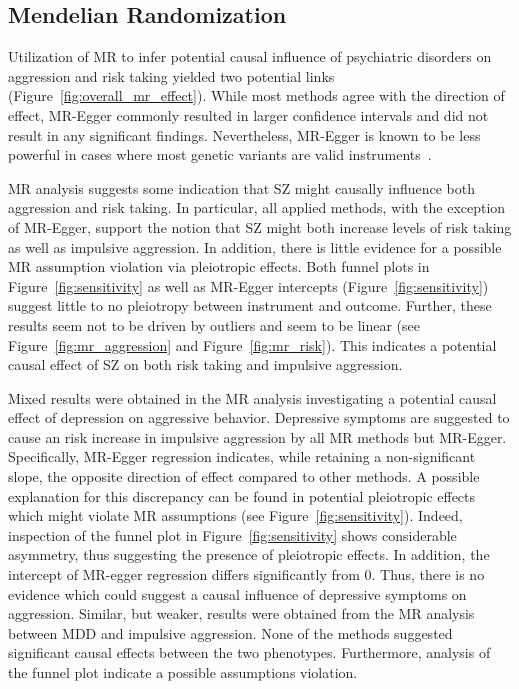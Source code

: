 \subsection{Mendelian Randomization}
\label{sub:mendelian_randomization}

Utilization of MR to infer potential causal influence of psychiatric disorders on aggression and risk taking yielded two potential links (Figure~\ref{fig:overall_mr_effect}).
While most methods agree with the direction of effect, MR-Egger commonly resulted in larger confidence intervals and did not result in any significant findings.
Nevertheless, MR-Egger is known to be less powerful in cases where most  genetic variants are valid instruments~\cite{Bowden2015}.

MR analysis suggests some indication that SZ might causally influence both aggression and risk taking.
In particular, all applied methods, with the exception of MR-Egger, support the notion that SZ might both increase levels of risk taking as well as impulsive aggression.
In addition, there is little evidence for a possible MR assumption violation via pleiotropic effects.
Both funnel plots in Figure~\ref{fig:sensitivity} as well as MR-Egger intercepts (Figure~\ref{fig:sensitivity}) suggest little to no pleiotropy between instrument and outcome.
Further, these results seem not to be driven by outliers and seem to be linear (see Figure~\ref{fig:mr_aggression} and Figure~\ref{fig:mr_risk}).
This indicates a potential causal effect of SZ on both risk taking and impulsive aggression.

Mixed results were obtained in the MR analysis investigating a potential causal effect of depression on aggressive behavior.
Depressive symptoms are suggested to cause an risk increase in impulsive aggression by all MR methods but MR-Egger.
Specifically, MR-Egger regression indicates, while retaining a non-significant slope, the opposite direction of effect compared to other  methods.  
A possible explanation for this discrepancy can be found in potential pleiotropic effects which might violate MR assumptions (see Figure~\ref{fig:sensitivity}).
Indeed, inspection of the funnel plot in Figure~\ref{fig:sensitivity} shows considerable asymmetry, thus suggesting the presence of pleiotropic effects.
In addition, the intercept of MR-egger regression differs significantly from $0$.
Thus, there is no evidence which could suggest a causal influence of depressive symptoms on aggression. 
Similar, but weaker, results were obtained from the MR analysis between MDD and impulsive aggression.
None of the  methods suggested significant causal effects between the two phenotypes. 
Furthermore, analysis of the funnel plot indicate a possible assumptions violation.

